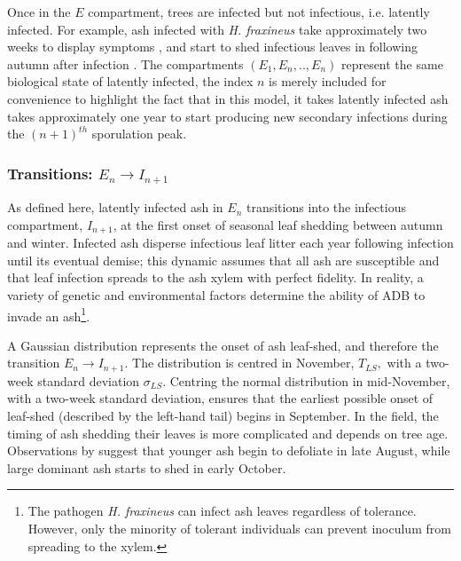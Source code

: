 Once in the $E$ compartment, trees are infected but not infectious, i.e. latently infected.
For example, ash infected with \textit{H. fraxineus} take approximately two weeks to display symptoms \cite{https://doi.org/10.1111/ppa.12048, https://doi.org/10.1111/ppa.12844},
and start to shed infectious leaves in following autumn after infection \cite{gross2014h}.
The compartments $(E_1, E_n,..,E_n)$ represent the same biological state of latently infected, the index $n$ is merely included for convenience to highlight the fact that in this model, it takes latently infected ash takes approximately one year to start producing new secondary infections during the $(n+1)^{th}$ sporulation peak.

\subsubsection{Transitions: $E_n\rightarrow I_{n+1}$}

As defined here, latently infected ash in $E_n$ transitions into the infectious compartment, $I_{n+1}$, at the first onset of seasonal leaf shedding between autumn and winter.
Infected ash disperse infectious leaf litter each year following infection until its eventual demise;
this dynamic assumes that all ash are susceptible and that leaf infection spreads to the ash xylem with perfect fidelity. 
In reality, a variety of genetic and environmental factors determine the ability of ADB to invade an ash\footnote{
The pathogen \textit{H. fraxineus} can infect ash leaves regardless of tolerance. However, only the minority of tolerant individuals can prevent inoculum from spreading to the xylem.}.

A Gaussian distribution represents the onset of ash leaf-shed, and therefore the transition $E_n\rightarrow I_{n+1}$.
The distribution is centred in November, $T_{LS},$ with a two-week standard deviation $\sigma_{LS}$.
Centring the normal distribution in mid-November, with a two-week standard deviation, ensures that the earliest possible onset of leaf-shed (described by the left-hand tail) begins in September.
In the field, the timing of ash shedding their leaves is more complicated and depends on tree age. 
Observations by \cite{hietala2013invasive} suggest that younger ash begin to defoliate in late August, while large dominant ash starts to shed in early October.

